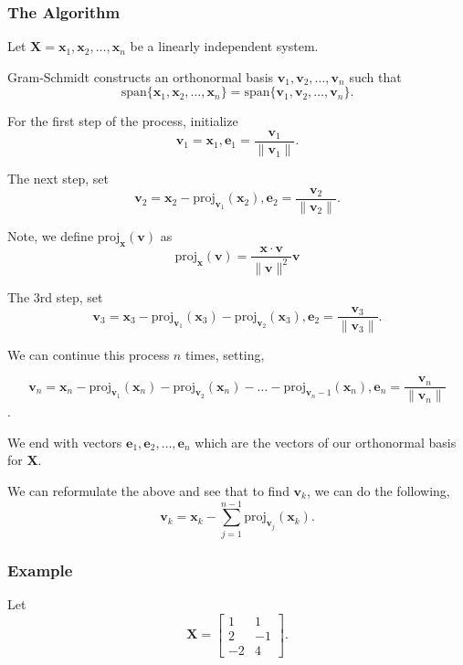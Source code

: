 \documentclass[onecolumn]{webofc}
\begin{document}
\subsubsection*{The Algorithm}
Let $\mathbf{X} = \mathbf{x}_1, \mathbf{x}_2, \ldots, \mathbf{x}_n$ be a linearly independent system.

Gram-Schmidt constructs an orthonormal basis $\mathbf{v}_1, \mathbf{v}_2, \ldots, \mathbf{v}_n$ such that $$\text{span}\{\mathbf{x}_1, \mathbf{x}_2, \ldots, \mathbf{x}_n\}= \text{span}\{\mathbf{v}_1, \mathbf{v}_2, \ldots, \mathbf{v}_n\}.$$

For the first step of the process, initialize $$\mathbf{v}_1= \mathbf{x}_1, \mathbf{e}_1 = \frac{\mathbf{v}_1}{\|\mathbf{v}_1\|}.$$

The next step, set $$\mathbf{v}_2 = \mathbf{x}_2 - \text{proj}_{\mathbf{v}_1}(\mathbf{x}_2), \mathbf{e}_2 = \frac{\mathbf{v}_2}{\|\mathbf{v}_2\|}.$$

Note, we define $\text{proj}_{\mathbf{x}}(\mathbf{v})$ as $$\text{proj}_{\mathbf{x}}(\mathbf{v}) = \frac{\mathbf{x} \cdot \mathbf{v}}{\|\mathbf{v}\|^{2}}\mathbf{v}$$

The 3rd step, set $$\mathbf{v}_3 = \mathbf{x}_3 - \text{proj}_{\mathbf{v}_1}(\mathbf{x}_3) - \text{proj}_{\mathbf{v}_2}(\mathbf{x}_3), \mathbf{e}_2 = \frac{\mathbf{v}_3}{\|\mathbf{v}_3\|}.$$

We can continue this process $n$ times,  setting,

$$\mathbf{v}_n = \mathbf{x}_n - \text{proj}_{\mathbf{v}_1}(\mathbf{x}_n) - \text{proj}_{\mathbf{v}_2}(\mathbf{x}_n)- \ldots - \text{proj}_{\mathbf{v}_n-1}(\mathbf{x}_n), \mathbf{e}_n = \frac{\mathbf{v}_n}{\|\mathbf{v}_n\|}$$.

We end with vectors $\mathbf{e}_1, \mathbf{e}_2, \ldots, \mathbf{e}_n$ which are the vectors of our orthonormal basis for $\mathbf{X}$. 

We can reformulate the above and see that to find $\mathbf{v}_k$, we can do the following,
$$\mathbf{v}_k = \mathbf{x}_k - \sum_{j=1}^{n-1}\text{proj}_{\mathbf{v}_j}(\mathbf{x}_k).$$

\subsubsection*{Example}
Let $$\mathbf{X} =  \begin{bmatrix}
1 & 1 \\
2 & -1 \\
-2 & 4 
\end{bmatrix}. $$
\end{document}
